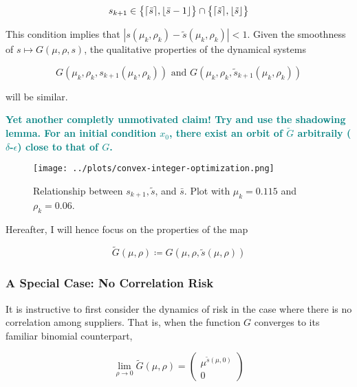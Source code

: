 \documentclass[american, abstract=on]{scrartcl}
\theoremstyle{plain}
\newcommand{\abs}[1]{\left\lvert#1\right\rvert}
\DeclarePairedDelimiter\ceil{\lceil}{\rceil}
\DeclarePairedDelimiter\floor{\lfloor}{\rfloor}
\newcommand\notes[1]{\textcolor{teal}{\footnotesize \textbf{#1}}}
\begin{document}
\begin{equation}
  s_{k + 1} \in \big\{ \ceil{\bar{s}}, \floor{\bar{s} - 1} \big\} \cap \big\{ \ceil{\tilde{s}}, \floor{\tilde{s}} \big\}
\end{equation}

This condition implies that $\abs{s(\mu_k, \rho_k) - \tilde{s}(\mu_k, \rho_k)} < 1$. Given the smoothness of $s \mapsto G(\mu, \rho, s)$, the qualitative properties of the dynamical systems

\begin{equation*}
    G(\mu_k, \rho_k, s_{k + 1}(\mu_k, \rho_k)) \text{ and } G(\mu_k, \rho_k, \tilde{s}_{k + 1}(\mu_k, \rho_k))
\end{equation*}

will be similar.

\notes{Yet another completly unmotivated claim! Try and use the shadowing lemma. For an initial condition $x_0$, there exist an orbit of $\tilde{G}$ arbitraily ($\delta$-$\epsilon$) close to that of $G$.}

\begin{figure}[H]
  \centering
  \texttt{[image: ../plots/convex-integer-optimization.png]}
  \caption{Relationship between $s_{k + 1}, \tilde{s}$, and $\bar{s}$. Plot with $\mu_k = 0.115$ and $\rho_k = 0.06$.}
  \label{fig:convex-integer-optimization}
\end{figure}

Hereafter, I will hence focus on the properties of the map

\begin{equation}
  \tilde{G}(\mu, \rho) \coloneqq G(\mu, \rho, \tilde{s}(\mu, \rho))
\end{equation}

\subsubsection{A Special Case: No Correlation Risk}

It is instructive to first consider the dynamics of risk in the case where there is no correlation among suppliers. That is, when the function $G$ converges to its familiar binomial counterpart,

\begin{equation}
   \lim_{\rho \rightarrow 0} \tilde{G}(\mu, \rho) = \begin{pmatrix} \mu^{\tilde{s}(\mu, 0)} \\ 0 \end{pmatrix} 
\end{equation}
\end{document}

